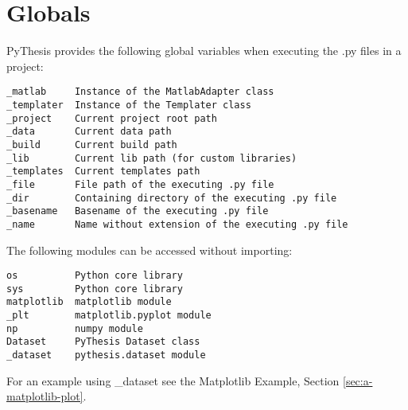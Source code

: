 \section{Globals}
\label{sec:globals}
PyThesis provides the following global variables when executing the .py files in a project:
\begin{verbatim}
_matlab     Instance of the MatlabAdapter class
_templater  Instance of the Templater class 
_project    Current project root path
_data       Current data path 
_build      Current build path 
_lib        Current lib path (for custom libraries)
_templates  Current templates path 
_file       File path of the executing .py file 
_dir        Containing directory of the executing .py file 
_basename   Basename of the executing .py file 
_name       Name without extension of the executing .py file 
\end{verbatim}

The following modules can be accessed without importing:
\begin{verbatim}
os          Python core library
sys         Python core library
matplotlib  matplotlib module
_plt        matplotlib.pyplot module
np          numpy module
Dataset     PyThesis Dataset class
_dataset    pythesis.dataset module
\end{verbatim}
For an example using \_dataset see the Matplotlib Example, Section \ref{sec:a-matplotlib-plot}.
